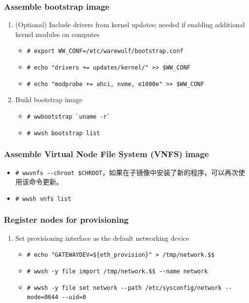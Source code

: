 {\subsubsection{Assemble bootstrap image}
\begin{enumerate}
\item (Optional) Include drivers from kernel updates; needed if enabling additional kernel modules on computes
\begin{itemize}
\item \verb|# export WW_CONF=/etc/warewulf/bootstrap.conf|
\item \verb|# echo "drivers += updates/kernel/" >> $WW_CONF|
\item \verb|# echo "modprobe += ahci, nvme, e1000e" >> $WW_CONF|
\end{itemize}

\item Build bootstrap image
\begin{itemize}
\item \verb|# wwbootstrap `uname -r`|
\item \verb|# wwsh bootstrap list|
\end{itemize}
\end{enumerate}


\subsubsection{Assemble Virtual Node File System (VNFS) image}
\begin{itemize}
\item \verb|# wwvnfs --chroot $CHROOT|，如果在子镜像中安装了新的程序，可以再次使用该命令更新。
\item \verb|# wwsh vnfs list|
\end{itemize}



\subsubsection{Register nodes for provisioning}
\begin{enumerate}
\item Set provisioning interface as the default networking device
\begin{itemize}
\item \verb|# echo "GATEWAYDEV=${eth_provision}" > /tmp/network.$$|
\item \verb|# wwsh -y file import /tmp/network.$$ --name network|
\item \verb|# wwsh -y file set network --path /etc/sysconfig/network --mode=0644 --uid=0|
\end{itemize}


\end{enumerate}}
